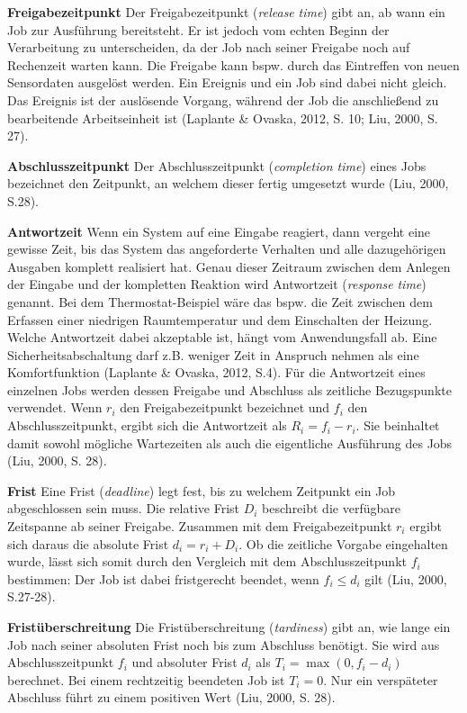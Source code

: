 \textbf{Freigabezeitpunkt }Der Freigabezeitpunkt (\emph{release} \emph{time}) gibt an, ab wann ein Job zur Ausführung bereitsteht. Er ist jedoch vom echten Beginn der Verarbeitung zu unterscheiden, da der Job nach seiner Freigabe noch auf Rechenzeit warten kann. Die Freigabe kann bspw. durch das Eintreffen von neuen Sensordaten ausgelöst werden. Ein Ereignis und ein Job sind dabei nicht gleich. Das Ereignis ist der auslösende Vorgang, während der Job die anschließend zu bearbeitende Arbeitseinheit ist (Laplante \& Ovaska, 2012, S. 10; Liu, 2000, S. 27).

\textbf{Abschlusszeitpunkt }Der Abschlusszeitpunkt (\emph{completion time}) eines Jobs bezeichnet den Zeitpunkt, an welchem dieser fertig umgesetzt wurde (Liu, 2000, S.28).

\textbf{Antwortzeit} Wenn ein System auf eine Eingabe reagiert, dann vergeht eine gewisse Zeit, bis das System das angeforderte Verhalten und alle dazugehörigen Ausgaben komplett realisiert hat. Genau dieser Zeitraum zwischen dem Anlegen der Eingabe und der kompletten Reaktion wird Antwortzeit (\emph{response} \emph{time}) genannt. Bei dem Thermostat-Beispiel wäre das bspw. die Zeit zwischen dem Erfassen einer niedrigen Raumtemperatur und dem Einschalten der Heizung. Welche Antwortzeit dabei akzeptable ist, hängt vom Anwendungsfall ab. Eine Sicherheitsabschaltung darf z.B. weniger Zeit in Anspruch nehmen als eine Komfortfunktion (Laplante \& Ovaska, 2012, S.4). Für die Antwortzeit eines einzelnen Jobs werden dessen Freigabe und Abschluss als zeitliche Bezugspunkte verwendet. Wenn \(r_i\) den Freigabezeitpunkt bezeichnet und \(f_i\) den Abschlusszeitpunkt, ergibt sich die Antwortzeit als \(R_i = f_i - r_i\). Sie beinhaltet damit sowohl mögliche Wartezeiten als auch die eigentliche Ausführung des Jobs (Liu, 2000, S. 28).

\textbf{Frist }Eine Frist (\emph{deadline}) legt fest, bis zu welchem Zeitpunkt ein Job abgeschlossen sein muss. Die relative Frist \(D_i\) beschreibt die verfügbare Zeitspanne ab seiner Freigabe. Zusammen mit dem Freigabezeitpunkt \(r_i\) ergibt sich daraus die absolute Frist \(d_i = r_i + D_i\). Ob die zeitliche Vorgabe eingehalten wurde, lässt sich somit durch den Vergleich mit dem Abschlusszeitpunkt \(f_i\) bestimmen: Der Job ist dabei fristgerecht beendet, wenn \(f_i \leq d_i\) gilt (Liu, 2000, S.27-28).

\textbf{Fristüberschreitung }Die Fristüberschreitung (\emph{tardiness}) gibt an, wie lange ein Job nach seiner absoluten Frist noch bis zum Abschluss benötigt. Sie wird aus Abschlusszeitpunkt \(f_i\) und absoluter Frist \(d_i\) als \(T_i = \max(0, f_i - d_i)\) berechnet. Bei einem rechtzeitig beendeten Job ist \(T_i = 0\). Nur ein verspäteter Abschluss führt zu einem positiven Wert (Liu, 2000, S. 28).

